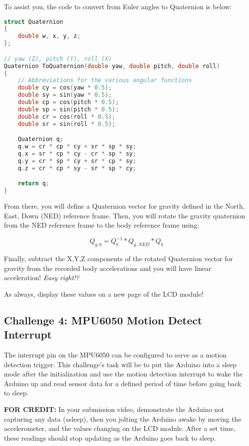     To assist you, the code to convert from Euler angles to Quaternion is below:
    \begin{lstlisting}[linewidth=1.5\textwidth, language=C++]
struct Quaternion
{
    double w, x, y, z;
};

// yaw (Z), pitch (Y), roll (X)
Quaternion ToQuaternion(double yaw, double pitch, double roll)
{
    // Abbreviations for the various angular functions
    double cy = cos(yaw * 0.5);
    double sy = sin(yaw * 0.5);
    double cp = cos(pitch * 0.5);
    double sp = sin(pitch * 0.5);
    double cr = cos(roll * 0.5);
    double sr = sin(roll * 0.5);

    Quaternion q;
    q.w = cr * cp * cy + sr * sp * sy;
    q.x = sr * cp * cy - cr * sp * sy;
    q.y = cr * sp * cy + sr * cp * sy;
    q.z = cr * cp * sy - sr * sp * cy;

    return q;
}
    \end{lstlisting}

    From there, you will define a Quaternion vector for gravity defined in the North, East, Down (NED) reference frame.
    Then, you will rotate the gravity quaternion from the NED reference frame to the body reference frame using:
    
    \begin{equation*}
        Q_{g,b} = Q_b^{-1} * Q_{g,NED} * Q_b
    \end{equation*}

    Finally, subtract the X,Y,Z components of the rotated Quaternion vector for gravity from the recorded body accelerations and you will have linear acceleration! \emph{Easy right!?}
    
    As always, display these values on a new page of the LCD module!
    
    \subsection*{Challenge 4: MPU6050 Motion Detect Interrupt}
    The interrupt pin on the MPU6050 can be configured to serve as a motion detection trigger.
    This challenge's task will be to put the Arduino into a sleep mode after the initialization and use the motion detection interrupt to wake the Arduino up and read sensor data for a defined period of time before going back to sleep.

    \textbf{FOR CREDIT:} In your submission video, demonstrate the Arduino not capturing any data (asleep), then you jolting the Arduino awake by moving the accelerometer, and the values changing on the LCD module.
    After a set time, these readings should stop updating as the Arduino goes back to sleep.
